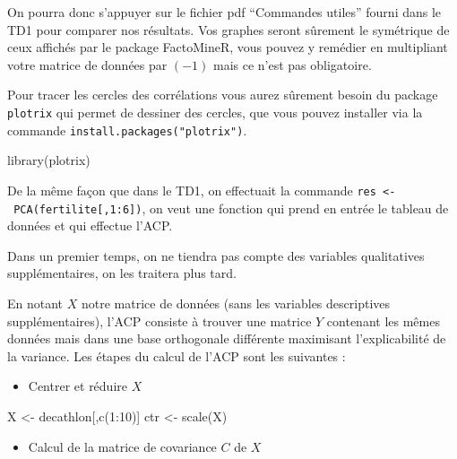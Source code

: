 \documentclass[
]{article}
\newenvironment{Shaded}{\begin{snugshade}}{\end{snugshade}}
\newcommand{\DecValTok}[1]{\textcolor[rgb]{0.00,0.00,0.81}{#1}}
\newcommand{\FunctionTok}[1]{\textcolor[rgb]{0.00,0.00,0.00}{#1}}
\newcommand{\NormalTok}[1]{#1}
\newcommand{\OtherTok}[1]{\textcolor[rgb]{0.56,0.35,0.01}{#1}}
\newcommand{\SpecialCharTok}[1]{\textcolor[rgb]{0.00,0.00,0.00}{#1}}
\providecommand{\tightlist}{%
  \setlength{\itemsep}{0pt}\setlength{\parskip}{0pt}}
\begin{document}
On pourra donc s'appuyer sur le fichier pdf ``Commandes utiles'' fourni
dans le TD1 pour comparer nos résultats. Vos graphes seront sûrement le
symétrique de ceux affichés par le package FactoMineR, vous pouvez y
remédier en multipliant votre matrice de données par \((-1)\) mais ce
n'est pas obligatoire.

Pour tracer les cercles des corrélations vous aurez sûrement besoin du
package \texttt{plotrix} qui permet de dessiner des cercles, que vous
pouvez installer via la commande \texttt{install.packages("plotrix")}.

\begin{Shaded}
\begin{Highlighting}[]
\FunctionTok{library}\NormalTok{(plotrix)}
\end{Highlighting}
\end{Shaded}

De la même façon que dans le TD1, on effectuait la commande
\texttt{res\ \textless{}-\ PCA(fertilite{[},1:6{]})}, on veut une
fonction qui prend en entrée le tableau de données et qui effectue
l'ACP.

Dans un premier temps, on ne tiendra pas compte des variables
qualitatives supplémentaires, on les traitera plus tard.

En notant \(X\) notre matrice de données (sans les variables
descriptives supplémentaires), l'ACP consiste à trouver une matrice
\(Y\) contenant les mêmes données mais dans une base orthogonale
différente maximisant l'explicabilité de la variance. Les étapes du
calcul de l'ACP sont les suivantes :

\begin{itemize}
\tightlist
\item
  Centrer et réduire \(X\)
\end{itemize}

\begin{Shaded}
\begin{Highlighting}[]
\NormalTok{X }\OtherTok{\textless{}{-}}\NormalTok{ decathlon[,}\FunctionTok{c}\NormalTok{(}\DecValTok{1}\SpecialCharTok{:}\DecValTok{10}\NormalTok{)]}
\NormalTok{ctr }\OtherTok{\textless{}{-}} \FunctionTok{scale}\NormalTok{(X)}
\end{Highlighting}
\end{Shaded}

\begin{itemize}
\tightlist
\item
  Calcul de la matrice de covariance \(C\) de \(X\)
\end{itemize}
\end{document}
